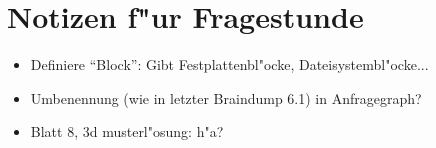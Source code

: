 \section{Notizen f"ur Fragestunde}
\begin{itemize}
	\item
		Definiere \enquote{Block}: Gibt Festplattenbl"ocke, Dateisystembl"ocke...
	\item
		Umbenennung (wie in letzter Braindump 6.1) in Anfragegraph?

	\item
		Blatt 8, 3d musterl"osung: h"a?
\end{itemize}
